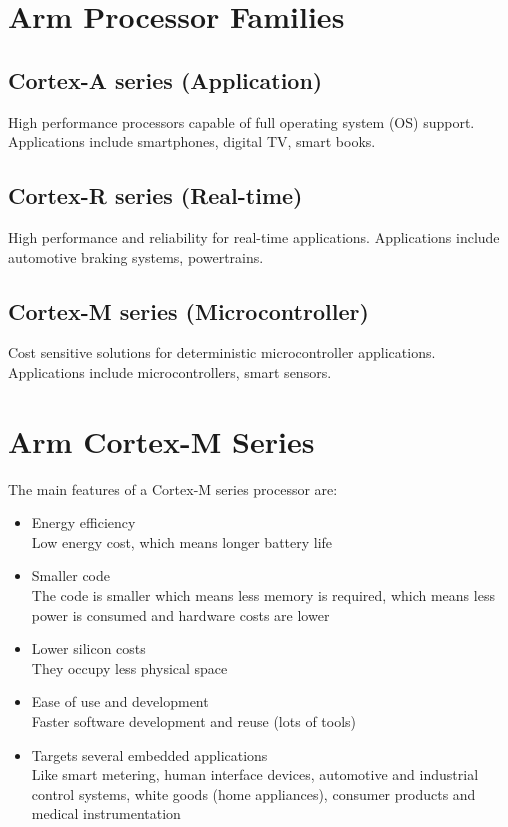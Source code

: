 \section{Arm Processor Families}

\subsection*{Cortex-A series (Application)}
High performance processors capable of full operating system (OS) support. Applications include smartphones, digital TV, smart books.


\subsection*{Cortex-R series (Real-time)}
High performance and reliability for real-time applications. Applications include automotive braking systems, powertrains.


\subsection*{Cortex-M series (Microcontroller)}  

Cost sensitive solutions for deterministic microcontroller applications. Applications include microcontrollers, smart sensors.


\section{Arm Cortex-M Series}

The main features of a Cortex-M series processor are:

\begin{itemize}
    \item Energy efficiency
    \\ Low energy cost, which means longer battery life
    \item Smaller code
    \\ The code is smaller which means less memory is required, which means less power is consumed and hardware costs are lower
    \item Lower silicon costs
    \\ They occupy less physical space
    \item Ease of use and development
    \\ Faster software development and reuse (lots of tools)
    \item Targets several embedded applications
    \\ Like smart metering, human interface devices, automotive and industrial control systems, white goods (home appliances), consumer products and medical instrumentation
\end{itemize}

